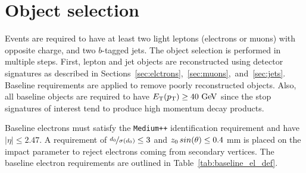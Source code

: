 \begin{table}[ht]
  \caption{Stop cross sections and their associated
    uncertainties.~\cite{Beenakker:1997ut,Beenakker:2010nq,Beenakker:2011fu}.
  }
  \label{tab:stop_xsec}
\end{table}

\FloatBarrier
\section{Object selection}
\label{sec:object_selection}

Events are required to have at least two light leptons (electrons or muons)
with opposite charge, and two $b$-tagged jets.
The object selection is performed in multiple steps. First, lepton and jet
objects are reconstructed using detector signatures as described in
Sections~\ref{sec:elctrons},~\ref{sec:muons},~and~\ref{sec:jets}.
Baseline requirements are applied to remove poorly reconstructed objects.
Also, all baseline objects are required to have $\ET(\pt) \geq 40 \GeV$ since the
stop signatures of interest tend to produce high momentum decay products.

Baseline electrons must satisfy the \texttt{Medium++} identification
requirement and have $|\eta| \leq 2.47$.
A requirement of $\nicefrac{d_0}{\sigma(d_0)} \leq 3$ and $z_0\,sin(\theta) \leq 0.4$ mm
is placed on the impact parameter to reject electrons coming from secondary
vertices.
The baseline electron requirements are outlined in
Table~\ref{tab:baseline_el_def}.

